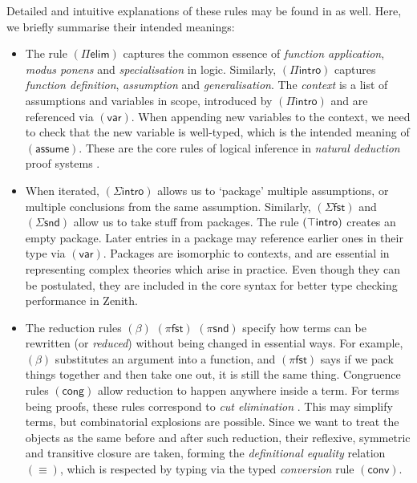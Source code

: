 \documentclass[twoside]{report}
\begin{document}
Detailed and intuitive explanations of these rules may be found in \cite{program2013homotopy} as well. Here, we briefly summarise their intended meanings:

\begin{itemize}
    \item The rule $(\Pi\mathsf{elim})$ captures the common essence of \emph{function application}, \emph{modus ponens} and \emph{specialisation} in logic. Similarly, $(\Pi\mathsf{intro})$ captures \emph{function definition}, \emph{assumption} and \emph{generalisation}. The \emph{context} is a list of assumptions and variables in scope, introduced by $(\Pi\mathsf{intro})$ and are referenced via $(\mathsf{var})$. When appending new variables to the context, we need to check that the new variable is well-typed, which is the intended meaning of $(\mathsf{assume})$. These are the core rules of logical inference in \emph{natural deduction} proof systems \cite{gentzen1964investigations}.

    \item When iterated, $(\Sigma\mathsf{intro})$ allows us to `package' multiple assumptions, or multiple conclusions from the same assumption. Similarly, $(\Sigma\mathsf{fst})$ and $(\Sigma\mathsf{snd})$ allow us to take stuff from packages. The rule $(\top\mathsf{intro})$ creates an empty package. Later entries in a package may reference earlier ones in their type via $(\mathsf{var})$. Packages are isomorphic to contexts, and are essential in representing complex theories which arise in practice. Even though they can be postulated, they are included in the core syntax for better type checking performance in Zenith.

    \item The reduction rules $(\beta)$ $(\pi\mathsf{fst})$ $(\pi\mathsf{snd})$ specify how terms can be rewritten (or \emph{reduced}) without being changed in essential ways. For example, $(\beta)$ substitutes an argument into a function, and $(\pi\mathsf{fst})$ says if we pack things together and then take one out, it is still the same thing. Congruence rules $(\mathsf{cong})$ allow reduction to happen anywhere inside a term. For terms being proofs, these rules correspond to \emph{cut elimination} \cite{gentzen1964investigations}. This may simplify terms, but combinatorial explosions are possible. Since we want to treat the objects as the same before and after such reduction, their reflexive, symmetric and transitive closure are taken, forming the \emph{definitional equality} relation $(\equiv)$, which is respected by typing via the typed \emph{conversion} rule $(\mathsf{conv})$.


\end{itemize}
\end{document}
